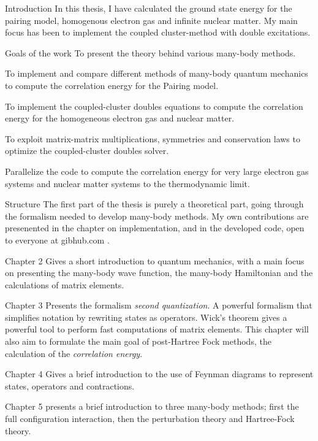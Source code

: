 \documentclass[twoside,english]{uiofysmaster}
\begin{document}
\tableofcontents


\begin{chapter}{Introduction}
	In this thesis, I have calculated the ground state energy for the pairing model, homogenous electron gas and infinite nuclear matter. My main focus has been to implement the coupled cluster-method with double excitations.

	\begin{subsection}{Goals of the work}
		To present the theory behind various many-body methods. 
 
		To implement and compare different methods of many-body quantum mechanics to compute the correlation energy for the Pairing model. 

		To implement the coupled-cluster doubles equations to compute the correlation energy for the homogeneous electron gas and nuclear matter. 

		To exploit matrix-matrix multiplications, symmetries and conservation laws to optimize the coupled-cluster doubles solver. 

		Parallelize the code to compute the correlation energy for very large electron gas systems and nuclear matter systems to the thermodynamic limit. 
	\end{subsection}

	\begin{subsection}{Structure}
		The first part of the thesis is purely a theoretical part, going through the formalism needed to develop many-body methods. My own contributions are presenented in the chapter on implementation, and in the developed code, open to everyone at gibhub.com \cite{WholmenGithub}.

		Chapter 2 Gives a short introduction to quantum mechanics, with a main focus on presenting the many-body wave function, the many-body Hamiltonian and the calculations of matrix elements. 

		Chapter 3 Presents the formalism \textit{second quantization}. A powerful formalism that simplifies notation by rewriting states as operators. Wick's theorem gives a powerful tool to perform fast computations of matrix elements. This chapter will also aim to formulate the main goal of post-Hartree Fock methods, the calculation of the \textit{correlation energy}. 

		Chapter 4 Gives a brief introduction to the use of Feynman diagrams to represent states, operators and contractions.

		Chapter 5 presents a brief introduction to three many-body methods; first the full configuration interaction, then the perturbation theory and Hartree-Fock theory. 


\end{subsection}
\end{chapter}
\end{document}
